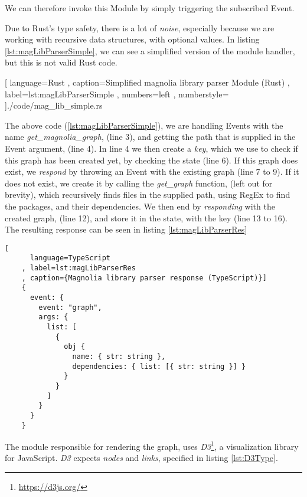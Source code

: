 We can therefore invoke this Module by simply triggering the subscribed Event.

Due to Rust's type safety, there is a lot of \textit{noise}, especially because
we are working with recursive data structures, with optional values. In listing
\ref{lst:magLibParserSimple}, we can see a simplified version of the module
handler, but this is not valid Rust code.

\begin{code}[H]
  
    [ language=Rust
    , caption={Simplified magnolia library parser Module (Rust)}
    , label=lst:magLibParserSimple
    , numbers=left
    , numberstyle=\tiny\color{gray}
    ]{./code/mag\_lib\_simple.rs}
\end{code}

The above code (\ref{lst:magLibParserSimple}), we are handling Events with the name
\textit{get\_magnolia\_graph}, (line 3), and getting the path that is supplied in
the Event argument, (line 4). In line 4 we then create a \textit{key}, which we
use to check if this graph has been created yet, by checking the state (line 6).
If this graph does exist, we \textit{respond} by throwing an Event with the
existing graph (line 7 to 9). If it does not exist, we create it by calling the
\textit{get\_graph} function, (left out for brevity), which recursively finds
files in the supplied path, using RegEx to find the packages, and their
dependencies. We then end by \textit{responding} with the created graph,
(line 12), and store it in the state, with the key (line 13 to 16). The
resulting response can be seen in listing \ref{lst:magLibParserRes}

\begin{code}[H]
  \begin{lstlisting}[
      language=TypeScript
    , label=lst:magLibParserRes
    , caption={Magnolia library parser response (TypeScript)}]
    {
      event: {
        event: "graph",
        args: {
          list: [
            {
              obj {
                name: { str: string },
                dependencies: { list: [{ str: string }] }
              }
            }
          ]
        }
      }
    }
  \end{lstlisting}
\end{code}

The module responsible for rendering the graph, uses
\textit{D3}\footnote{\url{https://d3js.org/}}, a visualization library for
JavaScript. \textit{D3} expects \textit{nodes} and \textit{links}, specified in
listing \ref{lst:D3Type}.

